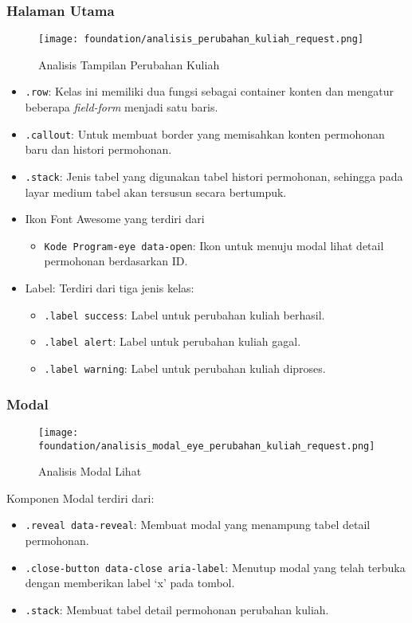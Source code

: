 \subsubsection{Halaman Utama}
\begin{figure} [H]
\centering  
\texttt{[image: foundation/analisis\_perubahan\_kuliah\_request.png]}
\caption{Analisis Tampilan Perubahan Kuliah}
\end{figure}
\begin{itemize}
	\item \texttt{.row}: Kelas ini memiliki dua fungsi sebagai container konten dan mengatur beberapa \textit{field-form} menjadi satu baris. 
	\item \texttt{.callout}: Untuk membuat border yang memisahkan konten permohonan baru dan histori permohonan.
	\item \texttt{.stack}: Jenis tabel yang digunakan tabel histori permohonan, sehingga pada layar medium tabel akan tersusun secara bertumpuk.
	\item Ikon Font Awesome yang terdiri dari 
	\begin{itemize}
		\item \texttt{Kode Program-eye data-open}: Ikon untuk menuju modal lihat detail permohonan berdasarkan ID.
	\end{itemize}
	\item Label: Terdiri dari tiga jenis kelas:
	\begin{itemize}
		\item \texttt{.label success}: Label untuk perubahan kuliah berhasil.
		\item \texttt{.label alert}: Label untuk perubahan kuliah gagal.
		\item \texttt{.label warning}: Label untuk perubahan kuliah diproses.
	\end{itemize}
	
\end{itemize}
\subsubsection{Modal}
\begin{figure} [H]
\centering  
\texttt{[image: foundation/analisis\_modal\_eye\_perubahan\_kuliah\_request.png]}
\caption{Analisis Modal Lihat}
\end{figure}
Komponen Modal terdiri dari:
\begin{itemize}
	\item \texttt{.reveal data-reveal}: Membuat modal yang menampung tabel detail permohonan.
	\item \texttt{.close-button data-close aria-label}: Menutup modal yang telah terbuka dengan memberikan label `x' pada tombol.
	\item \texttt{.stack}:	Membuat tabel detail permohonan perubahan kuliah.
\end{itemize}


